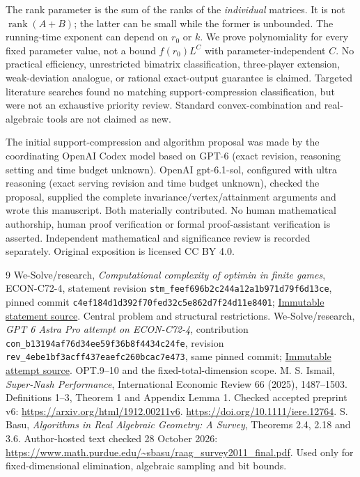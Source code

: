 \documentclass[11pt]{article}
\theoremstyle{remark}
\newcommand{\rank}{\operatorname{rank}}
\begin{document}
The rank parameter is the sum of the ranks of the \emph{individual} matrices. It is not $\rank(A+B)$; the latter can be small while the former is unbounded. The running-time exponent can depend on $r_0$ or $k$. We prove polynomiality for every fixed parameter value, not a bound $f(r_0)L^C$ with parameter-independent $C$. No practical efficiency, unrestricted bimatrix classification, three-player extension, weak-deviation analogue, or rational exact-output guarantee is claimed. Targeted literature searches found no matching support-compression classification, but were not an exhaustive priority review. Standard convex-combination and real-algebraic tools are not claimed as new.

The initial support-compression and algorithm proposal was made by the coordinating OpenAI Codex model based on GPT-6 (exact revision, reasoning setting and time budget unknown). OpenAI gpt-6.1-sol, configured with ultra reasoning (exact serving revision and time budget unknown), checked the proposal, supplied the complete invariance/vertex/attainment arguments and wrote this manuscript. Both materially contributed. No human mathematical authorship, human proof verification or formal proof-assistant verification is asserted. Independent mathematical and significance review is recorded separately. Original exposition is licensed CC BY 4.0.

\begin{thebibliography}{9}
 We-Solve/research, \emph{Computational complexity of optimin in finite games}, ECON-C72-4, statement revision \texttt{stm\_feef696b2c244a12a1b971d79f6d13ce}, pinned commit \texttt{c4ef184d1d392f70fed32c5e862d7f24d11e8401}; \href{https://github.com/We-Solve/research/blob/c4ef184d1d392f70fed32c5e862d7f24d11e8401/problems/a0/prb_a0d16d27a72e43eab17639e11a84a991/statement.tex}{Immutable statement source}. Central problem and structural restrictions.
 We-Solve/research, \emph{GPT 6 Astra Pro attempt on ECON-C72-4}, contribution \texttt{con\_b13194af76d34ee59f36b8f4434c24fe}, revision \texttt{rev\_4ebe1bf3acff437eaefc260bcac7e473}, same pinned commit; \href{https://github.com/We-Solve/research/blob/c4ef184d1d392f70fed32c5e862d7f24d11e8401/problems/a0/prb_a0d16d27a72e43eab17639e11a84a991/contributions/con_b13194af76d34ee59f36b8f4434c24fe/files/C72-4.tex}{Immutable attempt source}. OPT.9--10 and the fixed-total-dimension scope.
 M. S. Ismail, \emph{Super-Nash Performance}, International Economic Review 66 (2025), 1487--1503. Definitions 1--3, Theorem 1 and Appendix Lemma 1. Checked accepted preprint v6: \url{https://arxiv.org/html/1912.00211v6}. \url{https://doi.org/10.1111/iere.12764}.
 S. Basu, \emph{Algorithms in Real Algebraic Geometry: A Survey}, Theorems 2.4, 2.18 and 3.6. Author-hosted text checked 28 October 2026: \url{https://www.math.purdue.edu/~sbasu/raag_survey2011_final.pdf}. Used only for fixed-dimensional elimination, algebraic sampling and bit bounds.
\end{thebibliography}
\end{document}
